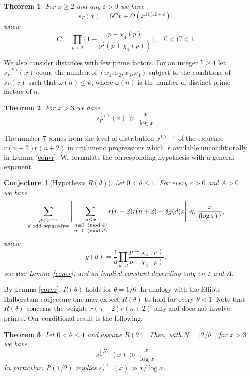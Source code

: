\documentclass[12pt]{amsart}
\newtheorem{theorem}{Theorem}
\newtheorem{conjecture}{Conjecture}
\theoremstyle{remark}
\renewcommand{\pmod}[1]{\mkern3mu(\mathrm{mod}\ #1)}
\begin{document}
\begin{theorem}\label{sqfree-theorem}
    For $x \ge 2$ and any $\varepsilon > 0$ we have
    \[
        s_{\Gamma}(x) = 6Cx + O(x^{11/12+ \varepsilon}),
    \]
    where
    \[
        C = \prod_{p > 2}\biggl(1-\frac{p-\chi_4(p)}{p^2(p+\chi_4(p))}\biggr), \quad 0 < C < 1.
    \]
\end{theorem}

We also consider distances with few prime factors. For an integer $k \ge 1$ let $s_{\Gamma}^{(k)}(x)$ count the number of $(x_1,x_2,x_3,x_4)$ subject to the conditions of $s_{\Gamma}(x)$ such that $\omega(n)\le k$, where $\omega(n)$ is the number of distinct prime factors of $n$.

\begin{theorem}\label{almostprimes-theorem}
    For $x > 3$ we have
    \[
        s_{\Gamma}^{(7)}(x) \gg \frac{x}{\log x}.
    \]
\end{theorem}
The number $7$ comes from the level of distribution $x^{1/6-\varepsilon}$ of the sequence $r(n-2)r(n+2)$ in arithmetic progressions which is available unconditionally in Lemma \ref{convr}.
We formulate the corresponding hypothesis with a general exponent.

\begin{conjecture}[Hypothesis $R(\theta)$] \label{conj-R}
    Let $0 < \theta \le 1$. 
    For every $\varepsilon>0$ and $A>0$ we have
    \[
        \sum_{\substack{d\le x^{\theta-\varepsilon}\\ d\ \mathrm{odd\ square\text{-}free}}}
        \Bigg|\sum_{\substack{n\le x\\ n\equiv3\ \pmod 4\\ n\equiv0\ \pmod d}}r(n-2)r(n+2)-8g(d)x\Bigg|\ll\frac{x}{(\log x)^A},
    \]
    where
    \[
        g(d) = \frac{1}{d} \prod_{p \mid d} \frac{p - \chi_4(p)}{p+\chi_4(p)},
    \]
    see also Lemma \ref{convr}, and an implied constant depending only on $\varepsilon$ and $A$.
\end{conjecture}
By Lemma \ref{convr}, $R(\theta)$ holds for $\theta = 1/6$. 
In analogy with the Elliott--Halberstam conjecture one may expect $R(\theta)$ to hold for every $\theta<1$. 
Note that $R(\theta)$ concerns the weights $r(n-2)r(n+2)$ only and does not involve primes.
Our conditional result is the following.
\begin{theorem}\label{almostprimes-theorem-conditional}
    Let $0 < \theta \le 1$ and assume $R(\theta)$.
    Then, with $N = \lfloor2/\theta\rfloor$, for $x > 3$ we have
    \[
        s_{\Gamma}^{(N)}(x)\gg\frac{x}{\log x}.
    \]
    In particular, $R(1/2)$ implies $s_{\Gamma}^{(4)}(x) \gg x/\log x$.
\end{theorem}
\end{document}
